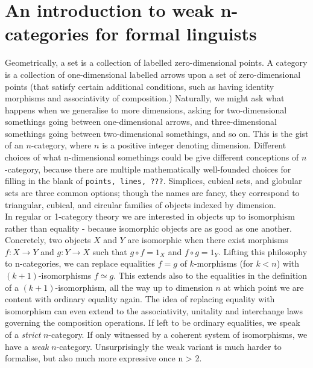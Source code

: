 \section{An introduction to weak n-categories for formal linguists}\label{sec:weakn}

Geometrically, a set is a collection of labelled zero-dimensional points. A category is a collection of one-dimensional labelled arrows upon a set of zero-dimensional points (that satisfy certain additional conditions, such as having identity morphisms and associativity of composition.) Naturally, we might ask what happens when we generalise to more dimensions, asking for two-dimensional somethings going between one-dimensional arrows, and three-dimensional somethings going between two-dimensional somethings, and so on. This is the gist of an $n$-category, where $n$ is a positive integer denoting dimension. Different choices of what n-dimensional somethings could be give different conceptions of $n$-category, because there are multiple mathematically well-founded choices for filling in the blank of \texttt{points, lines, ???}. Simplices, cubical sets, and globular sets are three common options; though the names are fancy, they correspond to triangular, cubical, and circular families of objects indexed by dimension.\\

In regular or 1-category theory we are interested in objects up to isomorphism rather than equality - because isomorphic objects are as good as one another.
Concretely, two objects $X$ and $Y$ are isomorphic when there exist morphisms $f : X \rightarrow Y$ and $g : Y \rightarrow X$ such that $g \circ f = 1_X$ and $f \circ g = 1_Y$. Lifting this philosophy to n-categories, we can replace equalities $f = g$ of $k$-morphisms (for $k < n$) with $(k + 1)$-isomorphisms $f \simeq g$. This extends also to the equalities in the definition of a $(k + 1)$-isomorphism, all the way up to dimension $n$ at which point we are content with ordinary equality again. The idea of replacing equality with isomorphism can even extend to the associativity, unitality and interchange laws governing the composition operations. If left to be ordinary equalities, we speak of a \emph{strict} $n$-category. If only witnessed by a coherent system of isomorphisms, we have a \emph{weak} $n$-category. Unsurprisingly the weak variant is much harder to formalise, but also much more expressive once n > 2.\\

